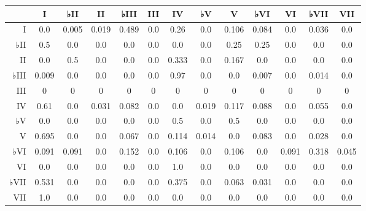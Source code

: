 \begin{table}[htbp]
\begin{minipage}{\linewidth}
\setlength{\tymax}{0.5\linewidth}
\centering
\small
\begin{tabulary}{\textwidth}{@{}RCCCCCCCCCCCC@{}} \toprule
&I&♭II&II&♭III&III&IV&♭V&V&♭VI&VI&♭VII&VII\\
\midrule
I&0.0&0.005&0.019&0.489&0.0&0.26&0.0&0.106&0.084&0.0&0.036&0.0\\
♭II&0.5&0.0&0.0&0.0&0.0&0.0&0.0&0.25&0.25&0.0&0.0&0.0\\
II&0.0&0.5&0.0&0.0&0.0&0.333&0.0&0.167&0.0&0.0&0.0&0.0\\
♭III&0.009&0.0&0.0&0.0&0.0&0.97&0.0&0.0&0.007&0.0&0.014&0.0\\
III&0&0&0&0&0&0&0&0&0&0&0&0\\
IV&0.61&0.0&0.031&0.082&0.0&0.0&0.019&0.117&0.088&0.0&0.055&0.0\\
♭V&0.0&0.0&0.0&0.0&0.0&0.5&0.0&0.5&0.0&0.0&0.0&0.0\\
V&0.695&0.0&0.0&0.067&0.0&0.114&0.014&0.0&0.083&0.0&0.028&0.0\\
♭VI&0.091&0.091&0.0&0.152&0.0&0.106&0.0&0.106&0.0&0.091&0.318&0.045\\
VI&0.0&0.0&0.0&0.0&0.0&1.0&0.0&0.0&0.0&0.0&0.0&0.0\\
♭VII&0.531&0.0&0.0&0.0&0.0&0.375&0.0&0.063&0.031&0.0&0.0&0.0\\
VII&1.0&0.0&0.0&0.0&0.0&0.0&0.0&0.0&0.0&0.0&0.0&0.0\\

\bottomrule

\end{tabulary}
\end{minipage}
\end{table}




